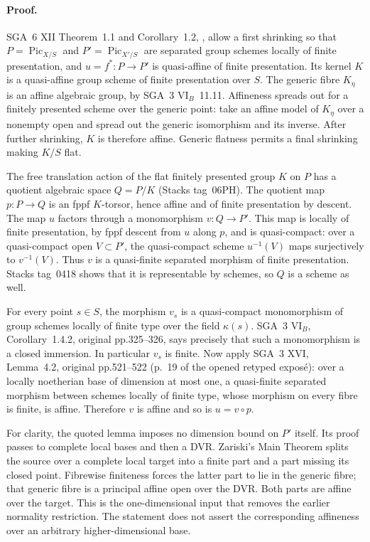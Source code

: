 \paragraph{Proof.}
SGA~6 XII Theorem~1.1 and Corollary~1.2,
\cite[original p.~596]{BCESGA6XII}, allow a first shrinking so that
$P=\operatorname{Pic}_{X/S}$ and $P'=\operatorname{Pic}_{X'/S}$ are separated
group schemes locally of finite presentation, and $u=f^*:P\to P'$ is
quasi-affine of finite presentation. Its kernel $K$ is a quasi-affine group
scheme of finite presentation over $S$. The generic fibre $K_\eta$ is an
affine algebraic group, by SGA~3 VI$_B$~11.11. Affineness spreads out for a
finitely presented scheme over the generic point: take an affine model of
$K_\eta$ over a nonempty open and spread out the generic isomorphism and
its inverse. After further shrinking, $K$ is therefore affine. Generic
flatness permits a final shrinking making $K/S$ flat.

The free translation action of the flat finitely presented group $K$ on
$P$ has a quotient algebraic space $Q=P/K$ (Stacks tag~06PH). The quotient
map $p:P\to Q$ is an fppf $K$-torsor, hence affine and of finite presentation
by descent. The map $u$ factors through a monomorphism $v:Q\to P'$.
This map is locally of finite presentation, by fppf descent from $u$ along
$p$, and is quasi-compact: over a quasi-compact open $V\subset P'$, the
quasi-compact scheme $u^{-1}(V)$ maps surjectively to $v^{-1}(V)$.
Thus $v$ is a quasi-finite separated morphism of finite presentation.
Stacks tag~0418 shows that it is representable by schemes, so $Q$ is a
scheme as well.

For every point $s\in S$, the morphism $v_s$ is a quasi-compact
monomorphism of group schemes locally of finite type over the field
$\kappa(s)$. SGA~3 VI$_B$, Corollary~1.4.2, original pp.325--326, says
precisely that such a monomorphism is a closed immersion. In particular
$v_s$ is finite. Now apply SGA~3 XVI, Lemma~4.2, original pp.521--522
(p.~19 of the opened retyped expos\'e): over a locally noetherian base
of dimension at most one, a quasi-finite separated morphism between
schemes locally of finite type, whose morphism on every fibre is finite,
is affine. Therefore $v$ is affine and so is $u=v\circ p$.

For clarity, the quoted lemma imposes no dimension bound on $P'$ itself.
Its proof passes to complete local bases and then a DVR. Zariski's Main
Theorem splits the source over a complete local target into a finite part
and a part missing its closed point. Fibrewise finiteness forces the latter
part to lie in the generic fibre; that generic fibre is a principal affine
open over the DVR. Both parts are affine over the target. This is the
one-dimensional input that removes the earlier normality restriction.
The statement does not assert the corresponding affineness over an
arbitrary higher-dimensional base.

